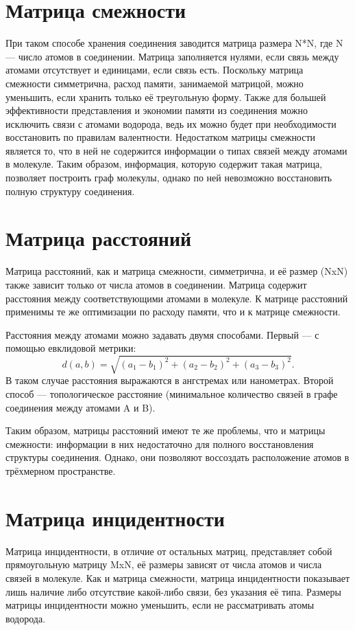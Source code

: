 \documentclass[a4paper,14pt]{extreport}
\begin{document}
  

  \section{Матрица смежности}
  \label{s:matrix_1_sec}
  При таком способе хранения соединения заводится матрица размера N*N, где N — число атомов в соединении. Матрица заполняется нулями, если связь между атомами отсутствует и единицами, если связь есть. Поскольку матрица смежности симметрична, расход памяти, занимаемой матрицой, можно уменьшить, если хранить только её треугольную форму. Также для большей эффективности представления и экономии памяти из соединения можно исключить связи с атомами водорода, ведь их можно будет при необходимости восстановить по правилам валентности. Недостатком матрицы смежности является то, что в ней не содержится информации о типах связей между атомами в молекуле. Таким образом, информация, которую содержит такая матрица, позволяет построить граф молекулы, однако по ней невозможно восстановить полную структуру соединения.
  \section{Матрица расстояний}
  \label{s:matrix_2_sec}
  Матрица расстояний, как и матрица смежности, симметрична, и её размер (NxN) также зависит только от числа атомов в соединении. Матрица содержит расстояния между соответствующими атомами в молекуле. К матрице расстояний применимы те же оптимизации по расходу памяти, что и к матрице смежности.
  
  Расстояния между атомами можно задавать двумя способами. Первый — с помощью евклидовой метрики:
  $$d(a,b)=\sqrt{(a_1-b_1)^2+(a_2-b_2)^2+(a_3-b_3)^2}.$$
  В таком случае расстояния выражаются в ангстремах или нанометрах. Второй способ — топологическое расстояние (минимальное количество связей в графе соединения между атомами A и B). 
  
  Таким образом, матрицы расстояний имеют те же проблемы, что и матрицы смежности: информации в них недостаточно для полного восстановления структуры соединения. Однако, они позволяют воссоздать расположение атомов в трёхмерном пространстве.


  \section{Матрица инцидентности}
  \label{s:matrix_3_sec}
  Матрица инцидентности, в отличие от остальных матриц, представляет собой прямоугольную матрицу MxN, её размеры зависят от числа атомов и числа связей в молекуле. Как и матрица смежности, матрица инцидентности показывает лишь наличие либо отсутствие какой-либо связи, без указания её типа. Размеры матрицы инцидентности можно уменьшить, если не рассматривать атомы водорода.
\end{document}
